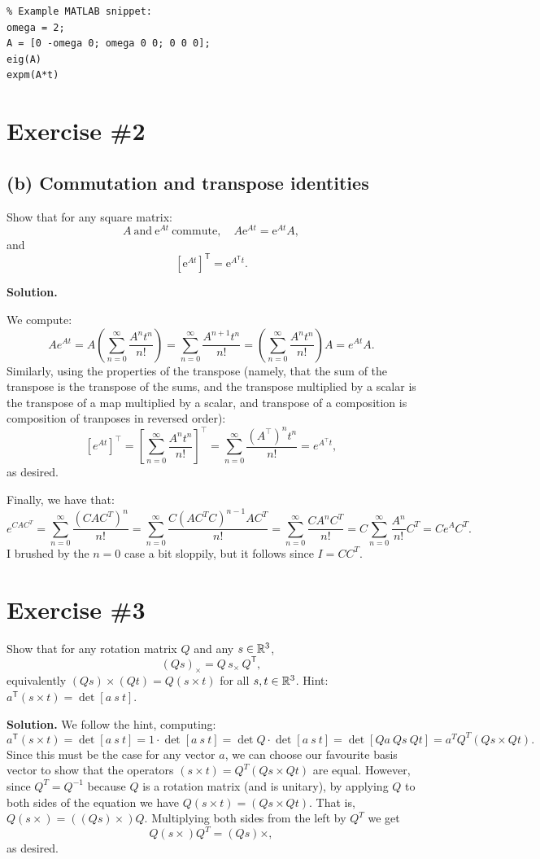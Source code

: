\documentclass[11pt]{article}
\newcommand{\T}{\mathsf{T}}
\newcommand{\e}{\mathrm{e}}
\begin{document}
\begin{verbatim}
% Example MATLAB snippet:
omega = 2;
A = [0 -omega 0; omega 0 0; 0 0 0];
eig(A)
expm(A*t)
\end{verbatim}

\section{Exercise \#2}
\subsection*{(b) Commutation and transpose identities}
Show that for any square matrix:
\[
A \ \text{and}\ \e^{At}\ \text{commute},\quad A\e^{At}=\e^{At}A,
\]
and
\[
\left[\e^{At}\right]^\T = \e^{A^\T t}.
\]

\textbf{Solution.}

We compute:
\[
Ae^{At} = A \left( \sum_{n = 0}^{\infty} \frac{A^{n}t^{n}}{n!} \right)  = \sum_{n=0}^{\infty} \frac{A^{n+1} t^{n}}{n!} = \left( \sum_{n=0}^{\infty} \frac{A^{n} t^n}{n!} \right) A = e^{At} A
.\] 
Similarly, using the properties of the transpose (namely, that the sum of the transpose is the transpose of the sums, and the transpose multiplied by a scalar is the transpose of a map multiplied by a scalar, and transpose of a composition is composition of tranposes in reversed order):
\[
\left[ e^{At} \right]^{\top} = \left[ \sum_{n=0}^{\infty} \frac{A^{n} t^n}{n!} \right]^{\top} = \sum_{n=0}^{\infty} \frac{(A^{\top})^{n}t^n}{n!} = e^{A^{\top} t}
,\] 
as desired.

Finally, we have that:
\[
e^{CAC^{T}} = \sum_{n=0}^{\infty} \frac{(CAC^{T})^{n}}{n!} = \sum_{n=0}^{\infty} \frac{C (A C^{T}C)^{n-1}AC^{T}}{n!} = \sum_{n=0}^{\infty} \frac{CA^{n} C^{T}}{n!} = C \sum_{n=0}^{\infty} \frac{A^{n}}{n!} C^{T} = C e^{A} C^{T}
.\] 
I brushed by the $n=0$ case a bit sloppily, but it follows since $I = C C^{T}$.

\section{Exercise \#3}
Show that for any rotation matrix $Q$ and any $s\in\mathbb{R}^3$,
\[
(Qs)_\times = Q\,s_\times\,Q^\T,
\]
equivalently $(Qs)\times(Qt) = Q(s\times t)$ for all $s,t\in\mathbb{R}^3$.
Hint: $a^\T(s\times t)=\det[a\ s\ t]$.


\textbf{Solution.}
We follow the hint, computing:
\[
a^{\T} (s \times t) = \det [a\ s\ t] = 1 \cdot \det [a\ s\ t] = \det Q \cdot \det [a\ s\ t] = \det[ Qa \ Qs \ Qt] = a^{T}Q^{T} (Qs \times Qt)
.\] 
Since this must be the case for any vector $a$, we can choose our favourite basis vector to show that the operators $(s \times t) = Q^{T} (Qs \times Qt)$ are equal.
However, since $Q^{T} = Q^{-1}$ because $Q$ is a rotation matrix (and is unitary), by applying $Q$ to both sides of the equation we have $Q(s \times t) = (Qs \times Qt)$.
That is, $Q(s\times) = ((Qs)\times )Q$.
Multiplying both sides from the left by $Q^{T}$ we get
\[
Q(s\times) Q^{T} = (Qs)\times
,\] 
as desired.
\end{document}
